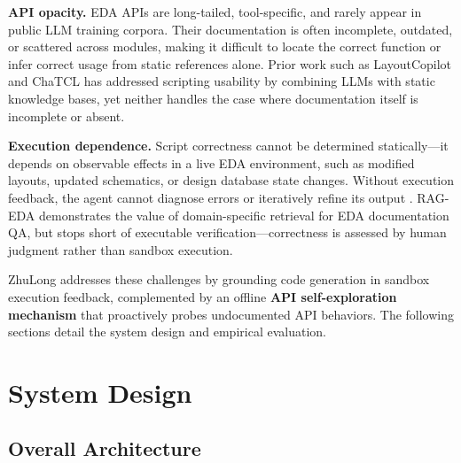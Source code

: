 \documentclass[anonymous, sigconf]{acmart}
\begin{document}
\textbf{API opacity.} EDA APIs are long-tailed, tool-specific, and rarely appear in public LLM training corpora. Their documentation is often incomplete, outdated, or scattered across modules, making it difficult to locate the correct function or infer correct usage from static references alone. Prior work such as LayoutCopilot \cite{liu2025layoutcopilot} and ChaTCL \cite{rui2025chatcl} has addressed scripting usability by combining LLMs with static knowledge bases, yet neither handles the case where documentation itself is incomplete or absent.

\textbf{Execution dependence.} Script correctness cannot be determined statically—it depends on observable effects in a live EDA environment, such as modified layouts, updated schematics, or design database state changes. Without execution feedback, the agent cannot diagnose errors or iteratively refine its output \cite{liu2024agentbench}. RAG-EDA \cite{pu2024rag} demonstrates the value of domain-specific retrieval for EDA documentation QA, but stops short of executable verification—correctness is assessed by human judgment rather than sandbox execution.

ZhuLong addresses these challenges by grounding code generation in sandbox execution feedback, complemented by an offline \textbf{API self-exploration mechanism} that proactively probes undocumented API behaviors. The following sections detail the system design and empirical evaluation.

\section{System Design}
\label{sec:system}

\subsection{Overall Architecture}
\label{sec:overall-architecture}
\end{document}
